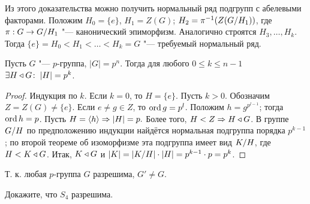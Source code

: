 \documentclass[main]{subfiles}
\begin{document}
\begin{remark}
  Из этого доказательства можно получить нормальный ряд подгрупп с абелевыми
  факторами. Положим $H_0 = \{ e \}$, $H_1 = Z(G)$;
  $H_2 = \pi^{-1}(Z(\Factor{G}[H_1]))$,
  где $\pi : G \to \Factor{G}[H_1]$ "--- канонический эпиморфизм.
  Аналогично строятся \( H_3, \dots, H_k \).
  Тогда $\{ e \} = H_0 < H_1 < \dots < H_k = G$ "---
  требуемый нормальный ряд.
\end{remark}

\begin{theorem}
  Пусть $G$ "--- $p$-группа, $|G| = p^n$. Тогда для любого $0 \le k \le n-1$
  $\exists H \triangleleft G \colon \: |H| = p^k$.
\end{theorem}
\begin{proof}
  Индукция по $k$. Если $k = 0$, то $H = \{ e \}$.
  Пусть $k > 0$. Обозначим $Z = Z(G) \ne \{ e \}$.
  Если $e \ne g \in Z$, то $\operatorname{ord} g = p^l$. Положим $h =
  g^{p^{l - 1}}$; тогда $\operatorname{ord} h = p$. Пусть $H = \langle h \rangle \Rightarrow
  |H| = p.$ Более того, $H < Z \Rightarrow H \triangleleft G$. В группе $\Factor{G}[H]$
  по предположению индукции найдётся нормальная подгруппа порядка
  $p^{k-1}$; по второй теореме об изоморфизме эта подгруппа имеет
  вид $\Factor{K}[H]$, где $H < K \triangleleft G$. Итак, $K \triangleleft G$ и $|K| = |\Factor{K}[H]| \cdot |H| =
  p^{k-1} \cdot p = p^k$.
\end{proof}

\begin{remark}
  Т. к. любая $p$-группа $G$ разрешима, $G' \ne G$.
\end{remark}

\begin{exercise}
  Докажите, что $S_4$ разрешима.
\end{exercise}
\end{document}
